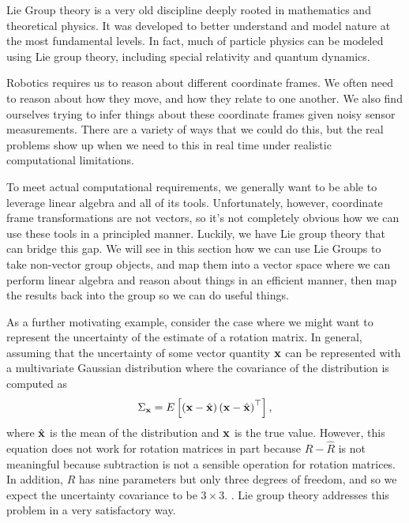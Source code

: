 Lie Group theory is a very old discipline deeply rooted in mathematics
and theoretical physics. It was developed to better understand and
model nature at the most fundamental levels. In fact, much of particle
physics can be modeled using Lie group theory, including special relativity
and quantum dynamics. 

Robotics requires us to reason about different coordinate frames. We often need to
reason about how they move, and how they relate to one another. We
also find ourselves trying to infer things about these coordinate
frames given noisy sensor measurements. There are a variety of ways
that we could do this, but the real problems show up when we need
to this in real time under realistic computational limitations. 

To meet actual computational requirements, we generally want to be
able to leverage linear algebra and all of its tools. Unfortunately,
however, coordinate frame transformations are not vectors, so it's
not completely obvious how we can use these tools in a principled
manner. Luckily, we have Lie group theory that can bridge this gap.
We will see in this section how we can use Lie Groups to take non-vector
group objects, and map them into a vector space where we can perform
linear algebra and reason about things in an efficient manner, then
map the results back into the group so we can do useful things.

As a further motivating example, consider the case where we might
want to represent the uncertainty of the estimate of a rotation matrix.
In general, assuming that the uncertainty of some vector quantity
$\mathbf{x}$ can be represented with a multivariate Gaussian distribution where
the covariance of the distribution is computed as
\[
\Sigma_{\mathbf{x}}=E\left[\left(\mathbf{x}-\hat{\mathbf{x}}\right)\left(\mathbf{x}-\hat{\mathbf{x}}\right)^{\top}\right],
\]
where $\hat{\mathbf{x}}$ is the mean of the distribution and $\mathbf{x}$ is the true value.
However, this equation does not work for rotation matrices in part because $R-\hat{R}$ is not meaningful because subtraction is not a sensible
operation for rotation matrices. In addition, $R$ has nine parameters but only three degrees of freedom, and so we expect the uncertainty covariance to be $3\times 3$.  . Lie group theory addresses this problem in a very satisfactory way.


